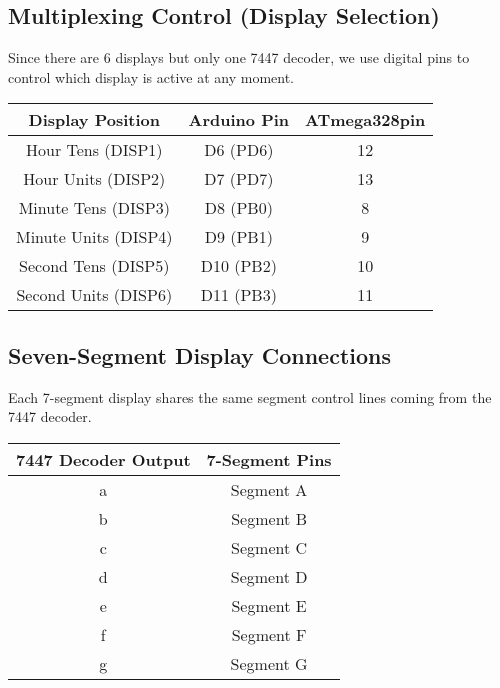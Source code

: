 \documentclass[a4paper,12pt]{article}
\theoremstyle{remark}
\begin{document}
\subsection{Multiplexing Control (Display Selection)}
Since there are 6 displays but only one 7447 decoder, we use digital pins to control which display is active at any moment.
\begin{table}[h!]
    \centering
    \begin{tabular}{|c|c|c|}
        \hline
        \textbf{Display Position} & \textbf{Arduino Pin} & \textbf{ATmega328pin} \\
        \hline
        Hour Tens (DISP1) & D6 (PD6) & 12\\
        Hour Units (DISP2) & D7 (PD7)&13\\
        Minute Tens (DISP3) & D8 (PB0)&8\\
        Minute Units (DISP4) & D9 (PB1)&9\\
        Second Tens (DISP5) & D10 (PB2)&10\\
        Second Units (DISP6) & D11 (PB3)&11\\
        \hline
    \end{tabular}
\end{table}

\subsection{Seven-Segment Display Connections}
Each 7-segment display shares the same segment control lines coming from the 7447 decoder.
\begin{table}[h]
    \centering
    \begin{tabular}{|c|c|}
        \hline
        \textbf{7447 Decoder Output} & \textbf{7-Segment Pins} \\
        \hline
        a & Segment A \\
        b & Segment B \\
        c & Segment C \\
        d & Segment D \\
        e & Segment E \\
        f & Segment F \\
        g & Segment G \\
        \hline
    \end{tabular}
\end{table}
\end{document}
